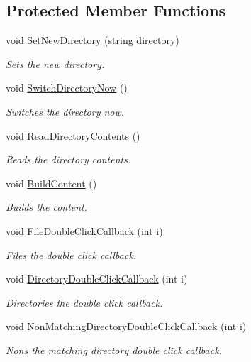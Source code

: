 \subsection*{Protected Member Functions}
\begin{DoxyCompactItemize}
\item 
void \hyperlink{class_lerp2_a_p_i_editor_1_1_utility_1_1_file_browser_editor_a5ba3763af8aed1eb77b3250707978d93}{Set\+New\+Directory} (string directory)
\begin{DoxyCompactList}\small\item\em Sets the new directory. \end{DoxyCompactList}\item 
void \hyperlink{class_lerp2_a_p_i_editor_1_1_utility_1_1_file_browser_editor_ad64538e2dd0a356c0740e978ba2f5509}{Switch\+Directory\+Now} ()
\begin{DoxyCompactList}\small\item\em Switches the directory now. \end{DoxyCompactList}\item 
void \hyperlink{class_lerp2_a_p_i_editor_1_1_utility_1_1_file_browser_editor_ad3a37b62683da556a3570b60fa0234bb}{Read\+Directory\+Contents} ()
\begin{DoxyCompactList}\small\item\em Reads the directory contents. \end{DoxyCompactList}\item 
void \hyperlink{class_lerp2_a_p_i_editor_1_1_utility_1_1_file_browser_editor_a5c21cf6853b07554ef1ff2e70371c11c}{Build\+Content} ()
\begin{DoxyCompactList}\small\item\em Builds the content. \end{DoxyCompactList}\item 
void \hyperlink{class_lerp2_a_p_i_editor_1_1_utility_1_1_file_browser_editor_af4b12af3787fa239a7aa33b639030b63}{File\+Double\+Click\+Callback} (int i)
\begin{DoxyCompactList}\small\item\em Files the double click callback. \end{DoxyCompactList}\item 
void \hyperlink{class_lerp2_a_p_i_editor_1_1_utility_1_1_file_browser_editor_a29120c2f32d629e3b02b7fe83110c513}{Directory\+Double\+Click\+Callback} (int i)
\begin{DoxyCompactList}\small\item\em Directories the double click callback. \end{DoxyCompactList}\item 
void \hyperlink{class_lerp2_a_p_i_editor_1_1_utility_1_1_file_browser_editor_a815b97f451609a09e1ee0c784373d8e3}{Non\+Matching\+Directory\+Double\+Click\+Callback} (int i)
\begin{DoxyCompactList}\small\item\em Nons the matching directory double click callback. \end{DoxyCompactList}\end{DoxyCompactItemize}
